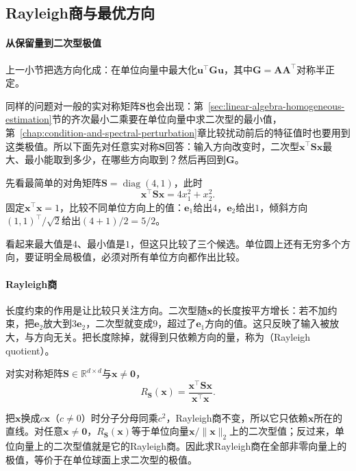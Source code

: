 \subsection{Rayleigh商与最优方向}
\label{sec:ls-quadratic-extrema}
\label{sec:ls-rayleigh-extremal}

\paragraph{从保留量到二次型极值}
上一小节把选方向化成：在单位向量中最大化$\bm u^\top\bm G\bm u$，其中$\bm G=\bm A\bm A^\top$对称半正定。

同样的问题对一般的实对称矩阵$\bm S$也会出现：第~\ref{sec:linear-algebra-homogeneous-estimation}节的齐次最小二乘要在单位向量中求二次型的最小值，第~\ref{chap:condition-and-spectral-perturbation}章比较扰动前后的特征值时也要用到这类极值。所以下面先对任意实对称$\bm S$回答：输入方向改变时，二次型$\bm x^\top\bm S\bm x$最大、最小能取到多少，在哪些方向取到？然后再回到$\bm G$。

先看最简单的对角矩阵$\bm S=\operatorname{diag}(4,1)$，此时
\[
 \bm x^\top\bm S\bm x=4x_1^2+x_2^2 .
\]
固定$\bm x^\top\bm x=1$，比较不同单位方向上的值：$\bm e_1$给出$4$，$\bm e_2$给出$1$，倾斜方向$(1,1)^\top/\sqrt2$给出$(4+1)/2=5/2$。

看起来最大值是$4$、最小值是$1$，但这只比较了三个候选。单位圆上还有无穷多个方向，要证明全局极值，必须对所有单位方向都作出比较。

\paragraph{Rayleigh商}
长度约束的作用是让比较只关注方向。二次型随$\bm x$的长度按平方增长：若不加约束，把$\bm e_2$放大到$3\bm e_2$，二次型就变成$9$，超过了$\bm e_1$方向的值。这只反映了输入被放大，与方向无关。把长度除掉，就得到只依赖方向的量，称为（Rayleigh quotient）。
\begin{definition}[Rayleigh商]
\label{def:matrix-analysis-rayleigh-quotient}
对实对称矩阵$\bm S\in\mathbb R^{d\times d}$与$\bm x\neq\bm0$，
\begin{equation}
 R_{\bm S}(\bm x)=\frac{\bm x^\top\bm S\bm x}{\bm x^\top\bm x}.
 \label{eq:matrix-analysis-rayleigh-quotient}
\end{equation}
\end{definition}

把$\bm x$换成$c\bm x$（$c\neq0$）时分子分母同乘$c^2$，Rayleigh商不变，所以它只依赖$\bm x$所在的直线。对任意$\bm x\neq\bm0$，$R_{\bm S}(\bm x)$等于单位向量$\bm x/\lVert\bm x\rVert_2$上的二次型值；反过来，单位向量上的二次型值就是它的Rayleigh商。因此求Rayleigh商在全部非零向量上的极值，等价于在单位球面上求二次型的极值。

